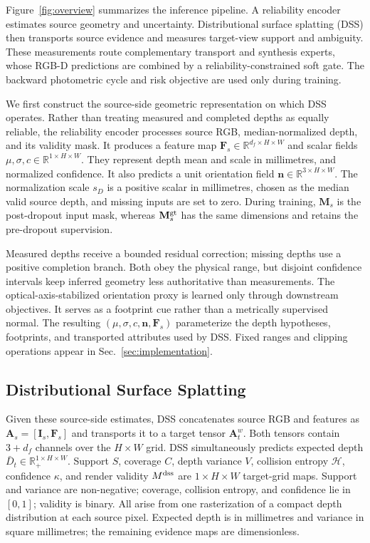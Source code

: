 \documentclass[letterpaper,10pt,conference]{ieeeconf}
\newcommand{\R}{\mathbb{R}}
\newcommand{\I}{\mathbf{I}}
\newcommand{\M}{\mathbf{M}}
\newcommand{\F}{\mathbf{F}}
\newcommand{\n}{\mathbf{n}}
\begin{document}
Figure~\ref{fig:overview} summarizes the inference pipeline. A
reliability encoder estimates source geometry and uncertainty. Distributional
surface splatting (DSS) then transports source evidence and measures target-view
support and ambiguity. These measurements route complementary transport and
synthesis experts, whose RGB-D predictions are combined by a
reliability-constrained soft gate. The backward photometric cycle and risk objective
are used only during training.

We first construct the source-side geometric representation on which DSS
operates. Rather than treating measured and completed depths as equally
reliable, the reliability encoder processes source RGB, median-normalized
depth, and its validity mask. It produces a feature map
$\F_s\in\R^{d_f\times H\times W}$ and scalar fields
$\mu,\sigma,c\in\R^{1\times H\times W}$. They represent depth mean and scale
in millimetres, and normalized confidence. It also predicts a unit orientation field
$\n\in\R^{3\times H\times W}$. The normalization scale $s_D$ is a positive
scalar in millimetres, chosen as the median valid source depth, and missing
inputs are set to zero. During training, $\M_s$ is the post-dropout input mask,
whereas $\M_s^{\rm gt}$ has the same dimensions and retains the pre-dropout
supervision.

Measured depths receive a bounded residual correction; missing depths use a
positive completion branch. Both obey the physical range, but disjoint
confidence intervals keep inferred geometry less authoritative than
measurements. The optical-axis-stabilized orientation proxy is learned only
through downstream objectives. It serves as a footprint cue rather than a
metrically supervised normal. The resulting $(\mu,\sigma,c,\n,\F_s)$ parameterize
the depth hypotheses, footprints, and transported attributes used by DSS. Fixed
ranges and clipping operations appear in Sec.~\ref{sec:implementation}.

\subsection{Distributional Surface Splatting}

Given these source-side estimates, DSS concatenates source RGB and features as
$\mathbf A_s=[\I_s,\F_s]$ and
transports it to a target tensor $\mathbf A_t^w$. Both tensors contain $3+d_f$
channels over the $H\times W$ grid. DSS simultaneously predicts expected depth
$\bar D_t\in\R_+^{1\times H\times W}$. Support $S$, coverage
$C$, depth variance $V$, collision entropy $\mathcal H$, confidence $\kappa$,
and render validity $M^{\rm dss}$ are $1\times H\times W$ target-grid maps.
Support and variance are non-negative; coverage, collision entropy, and
confidence lie in $[0,1]$; validity is binary. All arise from one rasterization
of a compact depth distribution at each source pixel. Expected depth is in
millimetres and variance in square millimetres; the remaining evidence maps are
dimensionless.
\end{document}
